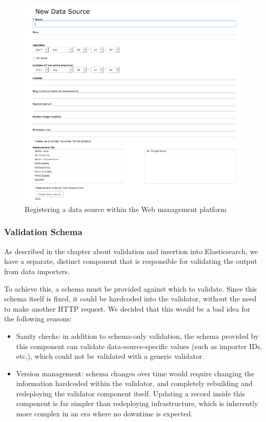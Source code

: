 \begin{figure}
	\includegraphics[width=1.00\textwidth]{images/new_datasource.png}
	\caption{Registering a data source within the Web management platform}
	\label{fig:register-source}
\end{figure}

\subsubsection{Validation Schema}\label{validation-schema}

As described in the chapter about validation and insertion into
Elasticsearch, we have a separate, distinct component that is
responsible for validating the output from data importers.

To achieve this, a schema must be provided against which to validate.
Since this schema itself is fixed, it could be hardcoded into the
validator, without the need to make another HTTP request. We decided
that this would be a bad idea for the following reasons:

\begin{itemize}
\tightlist
\item
  Sanity checks: in addition to schema-only validation, the schema
  provided by this component can validate data-source-specific values
  (such as importer IDs, etc.), which could not be validated with a
  generic validator.
\item
  Version management: schema changes over time would require changing
  the information hardcoded within the validator, and completely
  rebuilding and redeploying the validator component itself. Updating a
  record inside this component is far simpler than redeploying
  infrastructure, which is inherently more complex in an era where no
  downtime is expected.
\end{itemize}

